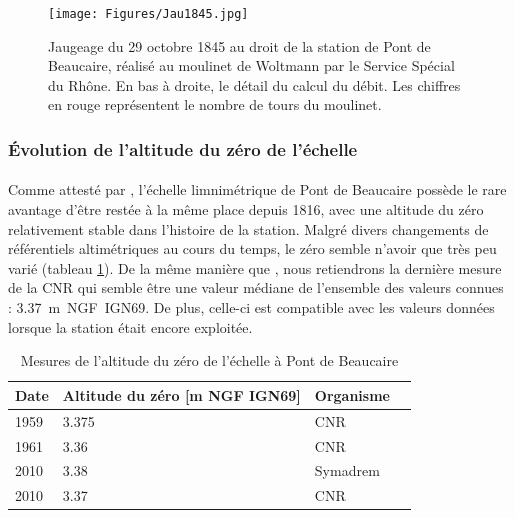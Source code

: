 \documentclass[11pt]{article}
\begin{document}
    \begin{figure}[h]
	\centering
		\texttt{[image: Figures/Jau1845.jpg]}
        \caption{Jaugeage du 29 octobre 1845 au droit de la station de Pont de Beaucaire, réalisé au moulinet de Woltmann par le Service Spécial du Rhône. En bas à droite, le détail du calcul du débit. Les chiffres en rouge représentent le nombre de tours du moulinet.}	
		\label{fig:Jau1845}
	\end{figure}
    	
\FloatBarrier

	\subsubsection{Évolution de l'altitude du zéro de l'échelle}
    
    \paragraph{} Comme attesté par \citet{pichard_hauteurs_2013}, l'échelle limnimétrique de Pont de Beaucaire possède le rare avantage d'être restée à la même place depuis 1816, avec une altitude du zéro relativement stable dans l'histoire de la station. Malgré divers changements de référentiels altimétriques au cours du temps, le zéro semble n'avoir que très peu varié (tableau \ref{tab:zeroPt}). De la même manière que \citet{bard_actualisation_2018}, nous retiendrons la dernière mesure de la CNR qui semble être une valeur médiane de l'ensemble des valeurs connues : 3.37~m~NGF~IGN69. De plus, celle-ci est compatible avec les valeurs données lorsque la station était encore exploitée.

            \begin{table}[h]
                \centering
                \caption{Mesures de l'altitude du zéro de l'échelle à Pont de Beaucaire}
            	\label{tab:zeroPt}
                \begin{tabular}{| m{1.5cm} | m{3cm}| m{3cm} | m{2cm} |} 
                    \hline
                    Date & Altitude du zéro [m NGF IGN69] & Organisme \\
                    \hline
                    1959 &	3.375 &	CNR\\
                    \hline
                    1961 &	3.36 &	CNR\\
                    \hline
                    2010 &	3.38 &	Symadrem\\
                    \hline
                    2010 &	3.37 &	CNR\\
                    \hline
            \end{tabular}
        \end{table}
\end{document}
